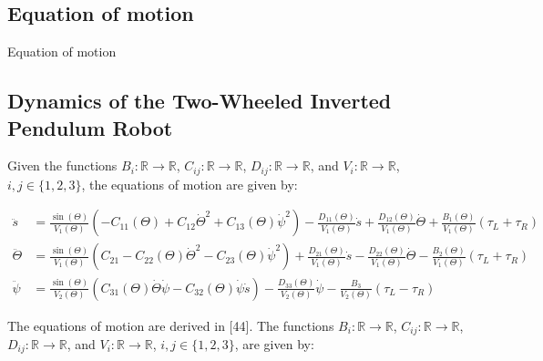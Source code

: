 \begin{itemize}
	\subsection{Equation of motion }
	Equation of motion 
	
	
	
	
	
	
	\subsection{Dynamics of the Two-Wheeled Inverted Pendulum Robot}
	Given the functions $B_i: \mathbb{R} \rightarrow \mathbb{R}$, $C_{ij}: \mathbb{R} \rightarrow \mathbb{R}$, $D_{ij}: \mathbb{R} \rightarrow \mathbb{R}$, and $V_i: \mathbb{R} \rightarrow \mathbb{R}$, $i,j \in \{1,2,3\}$, the equations of motion are given by:
	
	\begin{align}
		\ddot{s} &= \frac{\sin(\Theta)}{V_1(\Theta)} \left( -C_{11}(\Theta) + C_{12}\dot{\Theta}^2 + C_{13}(\Theta)\dot{\psi}^2 \right) - \frac{D_{11}(\Theta)}{V_1(\Theta)}\dot{s} + \frac{D_{12}(\Theta)}{V_1(\Theta)}\dot{\Theta} + \frac{B_{1}(\Theta)}{V_1(\Theta)}(\tau_L + \tau_R) \\
		\ddot{\Theta} &= \frac{\sin(\Theta)}{V_1(\Theta)} \left( C_{21} - C_{22}(\Theta)\dot{\Theta}^2 - C_{23}(\Theta)\dot{\psi}^2 \right) + \frac{D_{21}(\Theta)}{V_1(\Theta)}\dot{s} - \frac{D_{22}(\Theta)}{V_1(\Theta)}\dot{\Theta} - \frac{B_{2}(\Theta)}{V_1(\Theta)}(\tau_L + \tau_R)  \\
		\ddot{\psi} &= \frac{\sin(\Theta)}{V_2(\Theta)} \left( C_{31}(\Theta)\dot{\Theta}\dot{\psi} - C_{32}(\Theta)\dot{\psi}\dot{s} \right) - \frac{D_{33}(\Theta)}{V_2(\Theta)}\dot{\psi} - \frac{B_{3}}{V_2(\Theta)}(\tau_L - \tau_R)
	\end{align}
	
	
	The equations of motion are derived in [44]. The functions $B_i: \mathbb{R} \rightarrow \mathbb{R}$, $C_{ij}: \mathbb{R} \rightarrow \mathbb{R}$, $D_{ij}: \mathbb{R} \rightarrow \mathbb{R}$, and $V_i: \mathbb{R} \rightarrow \mathbb{R}$, $i,j \in \{1,2,3\}$, are given by:
	

\end{itemize}
